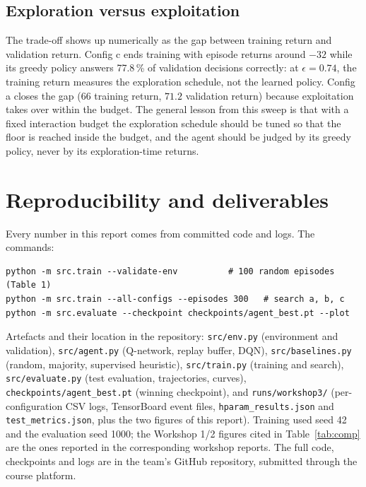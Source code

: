 \documentclass[11pt,a4paper]{article}
\begin{document}
\subsection{Exploration versus exploitation}

The trade-off shows up numerically as the gap between training return and validation return. Config c ends training with episode returns around $-32$ while its greedy policy answers 77.8\,\% of validation decisions correctly: at $\epsilon = 0.74$, the training return measures the exploration schedule, not the learned policy. Config a closes the gap ($66$ training return, $71.2$ validation return) because exploitation takes over within the budget. The general lesson from this sweep is that with a fixed interaction budget the exploration schedule should be tuned so that the floor is reached inside the budget, and the agent should be judged by its greedy policy, never by its exploration-time returns.

\section{Reproducibility and deliverables}

Every number in this report comes from committed code and logs. The commands:

\begin{verbatim}
python -m src.train --validate-env          # 100 random episodes (Table 1)
python -m src.train --all-configs --episodes 300   # search a, b, c
python -m src.evaluate --checkpoint checkpoints/agent_best.pt --plot
\end{verbatim}

Artefacts and their location in the repository: \texttt{src/env.py} (environment and validation), \texttt{src/agent.py} (Q-network, replay buffer, DQN), \texttt{src/baselines.py} (random, majority, supervised heuristic), \texttt{src/train.py} (training and search), \texttt{src/evaluate.py} (test evaluation, trajectories, curves), \texttt{checkpoints/agent\_best.pt} (winning checkpoint), and \texttt{runs/workshop3/} (per-configuration CSV logs, TensorBoard event files, \texttt{hparam\_results.json} and \texttt{test\_metrics.json}, plus the two figures of this report). Training used seed 42 and the evaluation seed 1000; the Workshop 1/2 figures cited in Table~\ref{tab:comp} are the ones reported in the corresponding workshop reports. The full code, checkpoints and logs are in the team's GitHub repository, submitted through the course platform.
\end{document}
